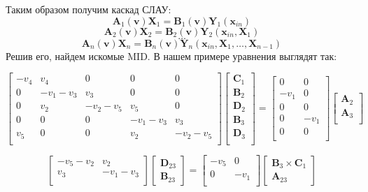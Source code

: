 \documentclass[14pt, a4paper]{extreport}
\begin{document}
Таким образом получим каскад СЛАУ:
$$\mathbf{A}_1(\mathbf{v})\mathbf{X}_1 = \mathbf{B}_1(\mathbf{v})\mathbf{Y}_1(\mathbf{x}_{in})$$
$$\mathbf{A}_2(\mathbf{v})\mathbf{X}_2 = \mathbf{B}_2(\mathbf{v})\mathbf{Y}_2(\mathbf{x}_{in}, \mathbf{X}_1)$$
$$\dots$$
$$\mathbf{A}_n(\mathbf{v})\mathbf{X}_n = \mathbf{B}_n(\mathbf{v})\mathbf{Y}_n(\mathbf{x}_{in}, \mathbf{X}_1, \ldots, \mathbf{X}_{n - 1})$$
Решив его, найдем искомые MID. В нашем примере уравнения выглядят так:

$$\begin{bmatrix}
-v_4 & v_4 & 0 & 0 & 0\\
0 & -v_1-v_3 & v_3 & 0 & 0\\
0 & v_2 & -v_2-v_5 & v_5 & 0\\
0 & 0 & 0 & -v_1-v_3 & v_3 \\
v_5 & 0 & 0 & v_2 & -v_2-v_5\\
\end{bmatrix}
\begin{bmatrix}
	\mathbf{C}_1\\
	\mathbf{B}_2\\
	\mathbf{D}_2\\
	\mathbf{B}_3\\
	\mathbf{D}_3\\
\end{bmatrix}
=
\begin{bmatrix}
	0 & 0\\
	-v_1 & 0\\
	0 & 0\\
	0 & -v_1\\
	0 & 0\\
\end{bmatrix}
\begin{bmatrix}
	\mathbf{A}_2\\
	\mathbf{A}_3\\
\end{bmatrix}$$

$$\begin{bmatrix}
-v_5-v_2 & v_2\\
v_3 & -v_1-v_3\\
\end{bmatrix}
\begin{bmatrix}
\mathbf{D}_{23}\\
\mathbf{B}_{23}
\end{bmatrix}
=
\begin{bmatrix}
-v_5 & 0\\
0 & -v_1\\
\end{bmatrix}
\begin{bmatrix}
\mathbf{B}_3 \times \mathbf{C}_1\\
\mathbf{A}_{23}
\end{bmatrix}$$
\end{document}
